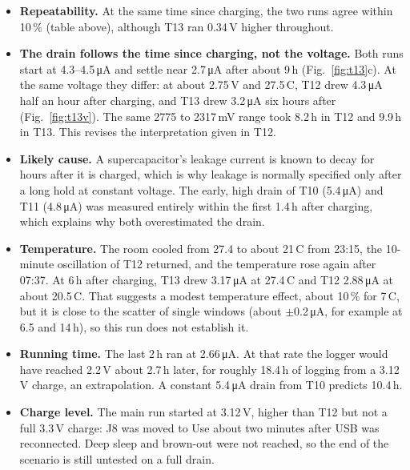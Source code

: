 \documentclass[11pt,a4paper]{article}
\newcommand{\uA}{\,\si{\micro\ampere}}
\begin{document}
\begin{itemize}
  \item \textbf{Repeatability.} At the same time since charging, the two runs agree within 10\,\% (table above), although T13 ran 0.34\,V higher throughout.
  \item \textbf{The drain follows the time since charging, not the voltage.} Both runs start at 4.3--4.5\uA{} and settle near 2.7\uA{} after about 9\,h (Fig.~\ref{fig:t13}c). At the same voltage they differ: at about 2.75\,V and 27.5\,\textdegree C, T12 drew 4.3\uA{} half an hour after charging, and T13 drew 3.2\uA{} six hours after (Fig.~\ref{fig:t13v}). The same 2775 to 2317\,mV range took 8.2\,h in T12 and 9.9\,h in T13. This revises the interpretation given in T12.
  \item \textbf{Likely cause.} A supercapacitor's leakage current is known to decay for hours after it is charged, which is why leakage is normally specified only after a long hold at constant voltage. The early, high drain of T10 (5.4\uA) and T11 (4.8\uA) was measured entirely within the first 1.4\,h after charging, which explains why both overestimated the drain.
  \item \textbf{Temperature.} The room cooled from 27.4 to about 21\,\textdegree C from 23:15, the 10-minute oscillation of T12 returned, and the temperature rose again after 07:37. At 6\,h after charging, T13 drew 3.17\uA{} at 27.4\,\textdegree C and T12 2.88\uA{} at about 20.5\,\textdegree C. That suggests a modest temperature effect, about 10\,\% for 7\,\textdegree C, but it is close to the scatter of single windows (about $\pm$0.2\uA, for example at 6.5 and 14\,h), so this run does not establish it.
  \item \textbf{Running time.} The last 2\,h ran at 2.66\uA. At that rate the logger would have reached 2.2\,V about 2.7\,h later, for roughly 18.4\,h of logging from a 3.12\,V charge, an extrapolation. A constant 5.4\uA{} drain from T10 predicts 10.4\,h.
  \item \textbf{Charge level.} The main run started at 3.12\,V, higher than T12 but not a full 3.3\,V charge: J8 was moved to Use about two minutes after USB was reconnected. Deep sleep and brown-out were not reached, so the end of the scenario is still untested on a full drain.
\end{itemize}
\end{document}
